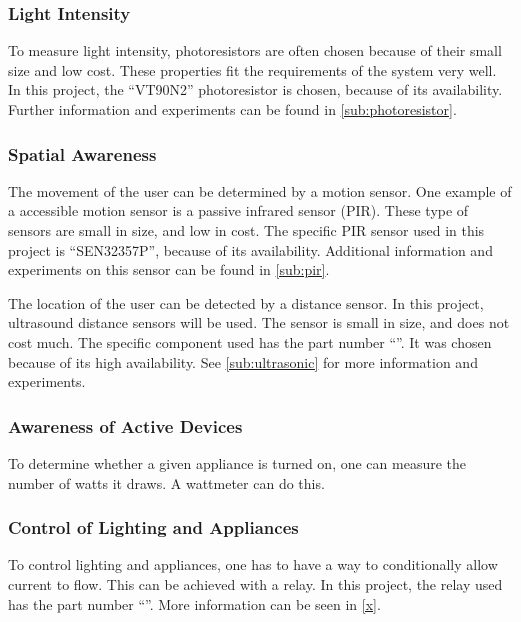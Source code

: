 \subsubsection{Light Intensity}
To measure light intensity, photoresistors are often chosen because of their small size and low cost. These properties fit the requirements of the system very well. In this project, the \enquote{VT90N2} photoresistor is chosen, because of its availability. Further information and experiments can be found in \cref{sub:photoresistor}.

\subsubsection{Spatial Awareness}
The movement of the user can be determined by a motion sensor. One example of a accessible motion sensor is a passive infrared sensor (PIR). These type of sensors are small in size, and low in cost. The specific PIR sensor used in this project is \enquote{SEN32357P}, because of its availability. Additional information and experiments on this sensor can be found in \cref{sub:pir}.

The location of the user can be detected by a distance sensor. In this project, ultrasound distance sensors will be used. The sensor is small in size, and does not cost much. The specific component used has the part number \enquote{}. It was chosen because of its high availability. See \cref{sub:ultrasonic} for more information and experiments.

\subsubsection{Awareness of Active Devices}
To determine whether a given appliance is turned on, one can measure the number of watts it draws. A wattmeter can do this.

\subsubsection{Control of Lighting and Appliances}
To control lighting and appliances, one has to have a way to conditionally allow current to flow. This can be achieved with a relay. In this project, the relay used has the part number \enquote{}. More information can be seen in \cref{x}.

